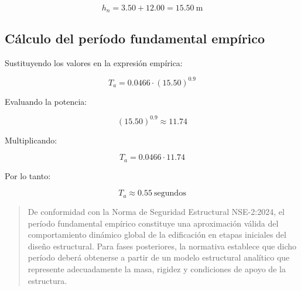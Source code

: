 \documentclass[14pt,letterpaper]{extarticle}
\begin{document}
	\begin{equation}
		h_n = 3.50 + 12.00 = 15.50 \ \text{m}
	\end{equation}
	
	\subsection{Cálculo del período fundamental empírico}
	
	Sustituyendo los valores en la expresión empírica:
	
	\begin{equation}
		T_a = 0.0466 \cdot (15.50)^{0.9}
	\end{equation}
	
	Evaluando la potencia:
	
	\begin{equation}
		(15.50)^{0.9} \approx 11.74
	\end{equation}
	
	Multiplicando:
	
	\begin{equation}
		T_a = 0.0466 \cdot 11.74
	\end{equation}
	
	Por lo tanto:
	
	\begin{equation}
		\boxed{T_a \approx 0.55 \ \text{segundos}}
	\end{equation}
	

	
	
	
	\begin{quote}
		De conformidad con la Norma de Seguridad Estructural NSE-2:2024, el período fundamental empírico constituye una aproximación válida del comportamiento dinámico global de la edificación en etapas iniciales del diseño estructural. Para fases posteriores, la normativa establece que dicho período deberá obtenerse a partir de un modelo estructural analítico que represente adecuadamente la masa, rigidez y condiciones de apoyo de la estructura.
	\end{quote}
	

	
	

	
	

	
	
	
	
	
	
\end{document}
